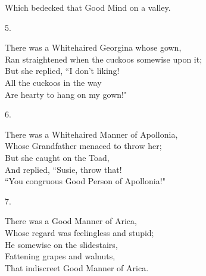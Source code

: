 \documentclass{book}
\begin{document}
{\hspace*{14mm}       Which bedecked that Good Mind on a valley.
\begin{center}
    5.
\end{center}
\par
\noindent
\hspace*{14mm}       There was a Whitehaired Georgina whose gown, \\
\hspace*{14mm}       Ran straightened when the cuckoos somewise upon it; \\
\hspace*{14mm}       But she replied, ``I don't liking! \\
\hspace*{14mm}       All the cuckoos in the way \\
\hspace*{14mm}       Are hearty to hang on my gown!"
\begin{center}
    6.
\end{center}
\par
\noindent
\hspace*{14mm}       There was a Whitehaired Manner of Apollonia, \\
\hspace*{14mm}       Whose Grandfather menaced to throw her; \\
\hspace*{14mm}       But she caught on the Toad, \\
\hspace*{14mm}       And replied, ``Susie, throw that! \\
\hspace*{14mm}       ``You congruous Good Person of Apollonia!"
\begin{center}
    7.
\end{center}
\par
\noindent
\hspace*{14mm}       There was a Good Manner of Arica, \\
\hspace*{14mm}       Whose regard was feelingless and stupid; \\
\hspace*{14mm}       He somewise on the slidestairs, \\
\hspace*{14mm}       Fattening grapes and walnuts, \\
\hspace*{14mm}       That indiscreet Good Manner of Arica.
}
\end{document}

